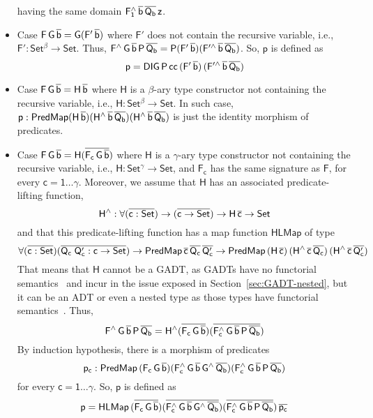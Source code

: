 \documentclass[acmsmall,screen,review,anonymous]{acmart}
\theoremstyle{definition}
\begin{document}
\begin{itemize}
having the same domain $\mathsf{F_1^{\wedge}\,\overline{b}\,\overline{Q_b}\,z}$.
\item Case $\mathsf{F\,G\,\overline{b} = G(F'\,\overline{b})}$
where $\mathsf{F'}$ does not contain the recursive variable,
i.e., $\mathsf{F' : Set^\beta \to Set}$.
Thus, $\mathsf{F^{\wedge}\,G\,\overline{b}\,P\,\overline{Q_b} = P (F'\,\overline{b}) (F'^{\wedge}\,\overline{b}\,\overline{Q_b})}$.
So, $\mathsf{p}$ is defined as
\[
\mathsf{p = DIG\,P\,cc\,(F'\,\overline{b})\,(F'^{\wedge}\,\overline{b}\,\overline{Q_b})}
\]
\item Case $\mathsf{F\,G\,\overline{b} = H\,\overline{b}}$
where $\mathsf{H}$ is a $\mathsf{\beta}$-ary type constructor not containing the recursive variable,
i.e., $\mathsf{H : Set^\beta \to Set}$.
In such case, $\mathsf{p : PredMap (H\,\overline{b}) (H^{\wedge}\,\overline{b}\,\overline{Q_b}) (H^{\wedge}\,\overline{b}\,\overline{Q_b})}$
is just the identity morphism of predicates.
\item Case $\mathsf{F\,G\,\overline{b} = H (\overline{F_c\,G\,\overline{b}})}$
where $\mathsf{H}$ is a $\mathsf{\gamma}$-ary type constructor not containing the recursive variable,
i.e., $\mathsf{H : Set^\gamma \to Set}$,
and $\mathsf{F_c}$ has the same signature as $\mathsf{F}$, for every $\mathsf{c = 1 \dots \gamma}$.
Moreover, we assume that $\mathsf{H}$ has an associated predicate-lifting function,
\[
\mathsf{H^{\wedge} : \forall (\overline{c : Set}) \to (\overline{c \to Set}) \to H\,\overline{c} \to Set}
\]
and that this predicate-lifting function has a map function $\mathsf{HLMap}$ of type
\[
\mathsf{\forall (\overline{c : Set}) (\overline{Q_c\;Q_c' : c \to Set}) \to PredMap\,\overline{c}\,\overline{Q_c}\,\overline{Q_c'}
\to PredMap\,(H\,\overline{c})\,(H^{\wedge}\,\overline{c}\,\overline{Q_c})\,(H^{\wedge}\,\overline{c}\,\overline{Q_c'})}
\]
That means that $\mathsf{H}$ cannot be a GADT,
as GADTs have no functorial semantics~\cite{HaskellPaper}
and incur in the issue exposed in Section~\ref{sec:GADT-nested},
but it can be an ADT or even a nested type as those types have functorial semantics~\cite{jp19,jgj21}.
Thus,
\[
\mathsf{F^{\wedge}\,G\,\overline{b}\,P\,\overline{Q_b} = H^{\wedge} (\overline{F_c\,G\,\overline{b}}) (\overline{F_c^{\wedge}\,G\,\overline{b}\,P\,\overline{Q_b}})}
\]
By induction hypothesis, there is a morphism of predicates
\[
\mathsf{p_c : PredMap\,(F_c\,G\,\overline{b}) (F_c^{\wedge}\,G\,\overline{b}\,G^{\wedge}\,\overline{Q_b}) (F_c^{\wedge}\,G\,\overline{b}\,P\,\overline{Q_b})}
\]
for every $\mathsf{c = 1 \dots \gamma}$.
So, $\mathsf{p}$ is defined as
\[
\mathsf{p
= HLMap\,(\overline{F_c\,G\,\overline{b}}) (\overline{F_c^{\wedge}\,G\,\overline{b}\,G^{\wedge}\,\overline{Q_b}}) (\overline{F_c^{\wedge}\,G\,\overline{b}\,P\,\overline{Q_b}})\,\overline{p_c}}
\]
\end{itemize}
\end{document}
